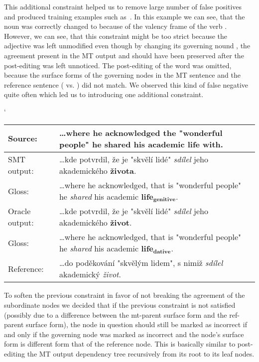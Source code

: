This additional constraint helped us to remove large number of false positives and produced training examples
such as~. In this example we can see, that the noun  was correctly changed
to  because of the valency frame of the verb . However, we can see, that this constraint
might be too strict because the adjective  was left unmodified even though by changing its
governing nound , the agreement present in the MT output and should have been preserved after the
post-editing was left unnoticed. The post-editing of the word  was omitted,
 because the surface forms of the governing nodes in the MT sentence and the reference sentence
( vs. ) did not match. We observed this kind of false negative quite often which
led us to introducing one additional constraint.

\begin{myexample}
    \small
    \catcode`
    \begin{center}
    \begin{tabular}{|l|p{}|}
    \hline
    \textbf{Source:}  &  \textbf{…where he acknowledged the "wonderful people" he shared his academic life with.}  \\
    \hline
    SMT output:  &  …kde potvrdil, že je "skvělí lidé" \textit{sdílel} jeho akademického \textbf{života}.  \\
    \hline
    Gloss:  &  …where he acknowledged, that is "wonderful people" he \textit{shared} his academic $\mathbf{life_{genitive}}$.  \\
    \hline
    Oracle output:  &  …kde potvrdil, že je "skvělí lidé" \textit{sdílel} jeho akademického \textbf{život}.  \\
    \hline
    Gloss:  &  …where he acknowledged, that is "wonderful people" he \textit{shared} his academic $\mathbf{life_{dative}}$.  \\
    \hline
    Reference:  &  …do poděkování "skvělým lidem", s nimiž \textit{sdílel} akademický \textit{život}.  \\
    \hline
    \end{tabular}
    \label{ex-oracle-parentref}
    \end{center}
\end{myexample}

To soften the previous constraint in favor of not breaking the agreement of the subordinate nodes we decided
that if the previous constraint is not satisfied (possibly due to a difference between the mt-parent surface form
and the ref-parent surface form), the node in question should still be marked as incorrect if and only if
the governing node was marked as incorrect and the node's surface form is different form that of the reference
node. This is basically similar to post-editing the MT output dependency tree recursively from its
root to its leaf nodes.

